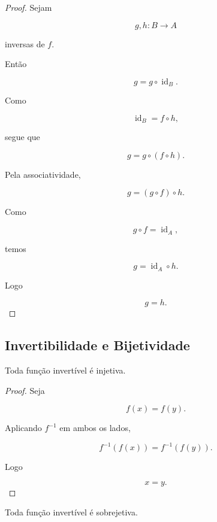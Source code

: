 \documentclass[../../main]{subfiles}
\begin{document}
\begin{proof}

	Sejam

	\[
		g,h:B\to A
	\]

	inversas de \(f\).

	Então

	\[
		g
		=
		g\circ\operatorname{id}_B.
	\]

	Como

	\[
		\operatorname{id}_B
		=
		f\circ h,
	\]

	segue que

	\[
		g
		=
		g\circ(f\circ h).
	\]

	Pela associatividade,

	\[
		g
		=
		(g\circ f)\circ h.
	\]

	Como

	\[
		g\circ f
		=
		\operatorname{id}_A,
	\]

	temos

	\[
		g
		=
		\operatorname{id}_A\circ h.
	\]

	Logo

	\[
		g=h.
	\]

\end{proof}

\subsection{Invertibilidade e Bijetividade}

\begin{prop}
	\label{prop:matematica:funcoes:funcoes-inversas:invertivel-implica-injetiva}

	Toda função invertível é injetiva.

\end{prop}

\begin{proof}

	Seja

	\[
		f(x)=f(y).
	\]

	Aplicando \(f^{-1}\) em ambos os lados,

	\[
		f^{-1}(f(x))
		=
		f^{-1}(f(y)).
	\]

	Logo

	\[
		x=y.
	\]

\end{proof}

\begin{prop}
	\label{prop:matematica:funcoes:funcoes-inversas:invertivel-implica-sobrejetiva}

	Toda função invertível é sobrejetiva.

\end{prop}
\end{document}
